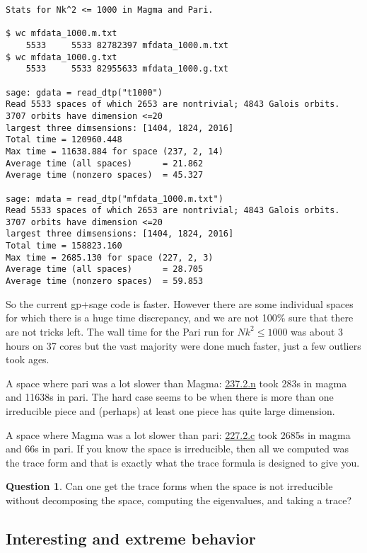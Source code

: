 \documentclass[11pt]{amsart}
\numberwithin{equation}{subsection}
\theoremstyle{plain}
\theoremstyle{definition}
\newtheorem{ques}[equation]{Question}
\begin{document}
\begin{verbatim}
Stats for Nk^2 <= 1000 in Magma and Pari.

$ wc mfdata_1000.m.txt 
    5533     5533 82782397 mfdata_1000.m.txt
$ wc mfdata_1000.g.txt 
    5533     5533 82955633 mfdata_1000.g.txt

sage: gdata = read_dtp("t1000")
Read 5533 spaces of which 2653 are nontrivial; 4843 Galois orbits.
3707 orbits have dimension <=20
largest three dimsensions: [1404, 1824, 2016]
Total time = 120960.448
Max time = 11638.884 for space (237, 2, 14)
Average time (all spaces)      = 21.862
Average time (nonzero spaces)  = 45.327

sage: mdata = read_dtp("mfdata_1000.m.txt")
Read 5533 spaces of which 2653 are nontrivial; 4843 Galois orbits.
3707 orbits have dimension <=20
largest three dimsensions: [1404, 1824, 2016]
Total time = 158823.160
Max time = 2685.130 for space (227, 2, 3)
Average time (all spaces)      = 28.705
Average time (nonzero spaces)  = 59.853
\end{verbatim}

So the current gp+sage code is faster.  However there are some individual spaces for which there is a huge time discrepancy, and we are not 100\% sure that there are not tricks left.  The wall time for the Pari run for $Nk^2 \leq 1000$ was about 3 hours on 37 cores but the vast majority were done much faster, just a few outliers took ages.  

A space where pari was a lot slower than Magma: \href{http://cmfs.lmfdb.xyz/ModularForm/GL2/Q/holomorphic/237/2/n/}{\textsf{237.2.n}} took 283s in magma and 11638s in pari.  The hard case seems to be when there is more than one irreducible piece and (perhaps) at least one piece has quite large dimension.

A space where Magma was a lot slower than pari: \href{http://cmfskatex.lmfdb.xyz/ModularForm/GL2/Q/holomorphic/227/2/c/}{\textsf{227.2.c}} took 2685s in magma and 66s in pari.  If you know the space is irreducible, then all we computed was the trace form and that is exactly what the trace formula is designed to give you.

\begin{ques}
Can one get the trace forms when the space is not irreducible without decomposing the space, computing the eigenvalues, and taking a trace?
\end{ques}

\subsection{Interesting and extreme behavior}
\end{document}
